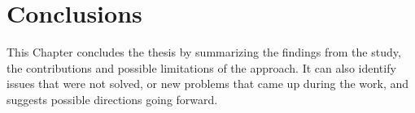 \chapter{Conclusions}
\label{chap:conclusions}

This Chapter concludes the thesis by summarizing the findings from the study, the contributions and possible limitations of the approach. It can also identify issues that were not solved, or new problems that came up during the work, and suggests possible directions going forward.
